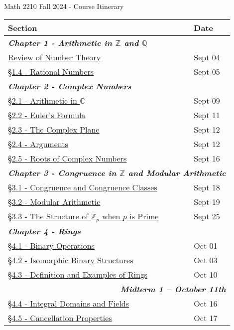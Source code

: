 \documentclass{article}
\newcommand{\chaptercolor}{RoyalBlue!35}
\newcommand{\testcolor}{Bittersweet!25}
\begin{document}
\large
\begin{center}
{\Huge Math 2210 Fall 2024 - Course Itinerary}
\vspace{0.25cm}

\begin{tabular}{|l|l|}
\cellcolor{black!85}\color{white}Section & \cellcolor{black!85}\color{white}Date\\
%
\hline
%
\multicolumn{2}{|l|}{\cellcolor{\chaptercolor} \textit{\textbf{Chapter 1 - Arithmetic in $\mathbb{Z}$ and $\mathbb{Q}$}}}\\
\hline
\href{}{Review of Number Theory\phantom{--------------------------------------------------------}} & Sept 04\\
\href{}{\S1.4 - Rational Numbers} & Sept 05\\
\hline
\multicolumn{2}{|l|}{\cellcolor{\chaptercolor} \textit{\textbf{Chapter 2 - Complex Numbers}}}\\
\hline
\href{}{\S2.1 - Arithmetic in $\mathbb{C}$} & Sept 09\\
\href{}{\S2.2 - Euler's Formula} & Sept 11\\
\href{}{\S2.3 - The Complex Plane} & Sept 12\\
\href{}{\S2.4 - Arguments} & Sept 12\\
\href{}{\S2.5 - Roots of Complex Numbers} & Sept 16\\
\hline
\multicolumn{2}{|l|}{\cellcolor{\chaptercolor} \textit{\textbf{Chapter 3 - Congruence in $\mathbb{Z}$ and Modular Arithmetic}}}\\
\hline
\href{}{\S3.1 - Congruence and Congruence Classes} & Sept 18\\
\href{}{\S3.2 - Modular Arithmetic} & Sept 19\\
\href{}{\S3.3 - The Structure of $\mathbb{Z}_{p}$ when $p$ is Prime} & Sept 25\\
\hline
\multicolumn{2}{|l|}{\cellcolor{\chaptercolor} \textit{\textbf{Chapter 4 - Rings}}}\\
\hline
\href{}{\S4.1 - Binary Operations} & Oct 01\\
\href{}{\S4.2 - Isomorphic Binary Structures} & Oct 03\\
\href{}{\S4.3 - Definition and Examples of Rings} & Oct 10\\
\hline
\multicolumn{2}{|r|}{\cellcolor{\testcolor} \textit{\textbf{Midterm 1 -- October 11th}}}\\
\hline
\href{}{\S4.4 - Integral Domains and Fields} & Oct 16\\
\href{}{\S4.5 - Cancellation Properties} & Oct 17\\

\end{tabular}
\end{center}
\end{document}
